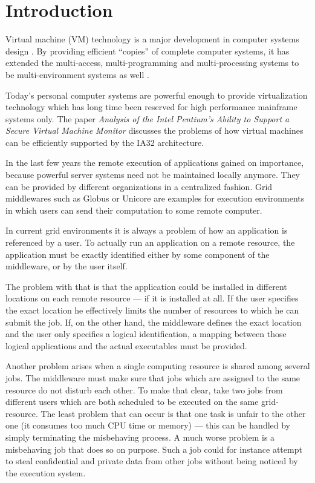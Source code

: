 
\chapter{Introduction}
\label{cha:intro}

Virtual machine (VM) technology is a major development in computer systems
design  \cite{buzen73}.  By  providing  efficient ``copies''  of  complete
computer systems, it has  extended the multi-access, multi-programming and
multi-processing   systems  to  be   multi-environment  systems   as  well
\cite{goldberg73}.

Today's  personal   computer  systems  are  powerful   enough  to  provide
virtualization  technology which  has  long time  been  reserved for  high
performance mainframe systems only.  The paper \emph{Analysis of the Intel
  Pentium's  Ability   to  Support  a  Secure   Virtual  Machine  Monitor}
\cite{robin00analysis} discusses the problems  of how virtual machines can
be efficiently supported by the IA32 architecture.

In  the last  few years  the remote  execution of  applications  gained on
importance, because powerful server systems need not be maintained locally
anymore. They can be provided  by different organizations in a centralized
fashion.  Grid  middle\-wares  such  as Globus  \cite{globus}  or  Unicore
\cite{unicore} are examples for  execution environments in which users can
send their computation to some remote computer.

In current grid environments it is  always a problem of how an application
is referenced  by a  user.  To  actually run an  application on  a remote
resource,  the  application must  be  exactly  identified  either by  some
component of the middleware, or by the user itself.

The  problem with  that  is that  the  application could  be installed  in
different  locations on each  remote resource  --- if  it is  installed at
all. If  the user specifies the  exact location he  effectively limits the
number of resources to which he can submit the job. If, on the other hand,
the middleware  defines the exact location  and the user  only specifies a
logical identification,  a mapping between those  logical applications and
the actual executables must be provided.

Another problem  arises when a  single computing resource is  shared among
several jobs. The  middleware must make sure that  jobs which are assigned
to the same  resource do not disturb each other. To  make that clear, take
two jobs from  different users which are both scheduled  to be executed on
the same grid-resource. The least problem  that can occur is that one task
is unfair to the  other one (\ie it consumes too much  CPU time or memory)
--- this can be handled  by simply terminating the misbehaving process.  A
much worse  problem is a misbehaving job  that does so on  purpose. Such a
job could for instance attempt to steal confidential and private data from
other jobs without being noticed by the execution system.

